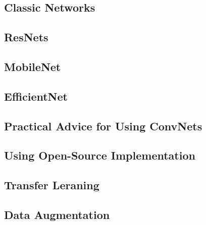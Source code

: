 \documentclass[letterpaper,12pt,notitlepage,twoside]{report}
\begin{document}
\subsection*{Classic Networks}

\subsection*{ResNets}
\subsection*{MobileNet}
\subsection*{EfficientNet}


\subsection{Practical Advice for Using ConvNets}
\subsection*{Using Open-Source Implementation}
\subsection*{Transfer Leraning}
\subsection*{Data Augmentation}
\end{document}

